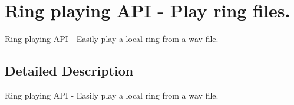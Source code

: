\section{Ring playing A\-P\-I -\/ Play ring files.}
\label{group__ring__api}


Ring playing A\-P\-I -\/ Easily play a local ring from a wav file.  




\subsection{Detailed Description}
Ring playing A\-P\-I -\/ Easily play a local ring from a wav file. 